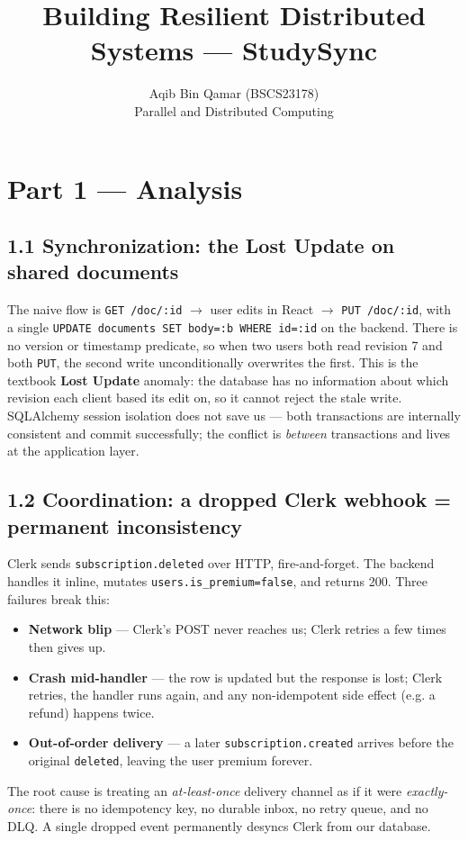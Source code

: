 \documentclass[11pt]{article}
\title{\vspace{-2em}\textbf{Building Resilient Distributed Systems --- StudySync}}
\author{Aqib Bin Qamar \quad (BSCS23178) \\ \small Parallel and Distributed Computing}
\date{\vspace{-0.8em}}
\begin{document}
\maketitle
\vspace{-2.0em}

\section*{Part 1 --- Analysis}

\subsection*{1.1 Synchronization: the Lost Update on shared documents}
The naive flow is \texttt{GET /doc/:id} $\rightarrow$ user edits in React $\rightarrow$ \texttt{PUT /doc/:id}, with a single
\texttt{UPDATE documents SET body=:b WHERE id=:id} on the backend. There is no version or timestamp predicate, so
when two users both read revision 7 and both \texttt{PUT}, the second write unconditionally overwrites the first. This is the
textbook \textbf{Lost Update} anomaly: the database has no information about which revision each client based its edit on,
so it cannot reject the stale write. SQLAlchemy session isolation does not save us --- both transactions are internally
consistent and commit successfully; the conflict is \emph{between} transactions and lives at the application layer.

\subsection*{1.2 Coordination: a dropped Clerk webhook = permanent inconsistency}
Clerk sends \texttt{subscription.deleted} over HTTP, fire-and-forget. The backend handles it inline, mutates
\texttt{users.is\_premium=false}, and returns 200. Three failures break this:
\begin{itemize}
  \item \textbf{Network blip} --- Clerk's POST never reaches us; Clerk retries a few times then gives up.
  \item \textbf{Crash mid-handler} --- the row is updated but the response is lost; Clerk retries, the handler runs
  again, and any non-idempotent side effect (e.g. a refund) happens twice.
  \item \textbf{Out-of-order delivery} --- a later \texttt{subscription.created} arrives before the original
  \texttt{deleted}, leaving the user premium forever.
\end{itemize}
The root cause is treating an \emph{at-least-once} delivery channel as if it were \emph{exactly-once}: there is no
idempotency key, no durable inbox, no retry queue, and no DLQ. A single dropped event permanently desyncs Clerk
from our database.
\end{document}
